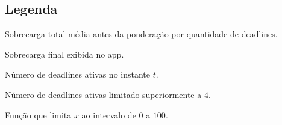 \documentclass[12pt,a4paper]{article}
\begin{document}
\subsection*{Legenda}

\begin{description}[leftmargin=2.2cm]
    \item[$S_T$] Sobrecarga total média antes da ponderação por quantidade de deadlines.
    \item[$S$] Sobrecarga final exibida no app.
    \item[$|D_a(t)|$] Número de deadlines ativas no instante $t$.
    \item[$m$] Número de deadlines ativas limitado superiormente a $4$.
    \item[$\operatorname{clip}_{[0,100]}(x)$] Função que limita $x$ ao intervalo de $0$ a $100$.
\end{description}
\end{document}
